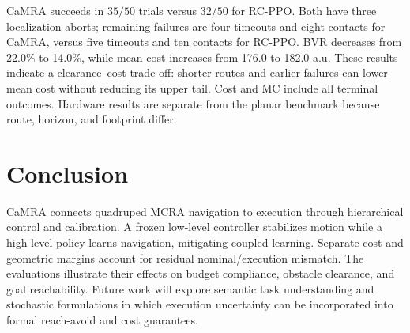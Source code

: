 \documentclass[conference]{IEEEtran}
\begin{document}
CaMRA succeeds in $35/50$ trials versus $32/50$ for RC-PPO. Both have three
localization aborts; remaining failures are four timeouts and eight contacts for
CaMRA, versus five timeouts and ten contacts for RC-PPO. BVR decreases from
22.0\% to 14.0\%, while mean cost increases from 176.0 to 182.0 a.u. These
results indicate a clearance--cost trade-off: shorter routes and earlier failures
can lower mean cost without reducing its upper tail. Cost and MC include all
terminal outcomes. Hardware results are separate from the planar benchmark
because route, horizon, and footprint differ.

\section{Conclusion}
CaMRA connects quadruped MCRA navigation to execution through hierarchical control
and calibration. A frozen low-level controller stabilizes motion while a
high-level policy learns navigation, mitigating coupled learning. Separate cost
and geometric margins account for residual nominal/execution mismatch. The
evaluations illustrate their effects on budget compliance, obstacle clearance,
and goal reachability. Future work will explore semantic task understanding and
stochastic formulations in which execution uncertainty can be incorporated into
formal reach-avoid and cost guarantees.

\IEEEtriggercmd{\balance}


\end{document}

